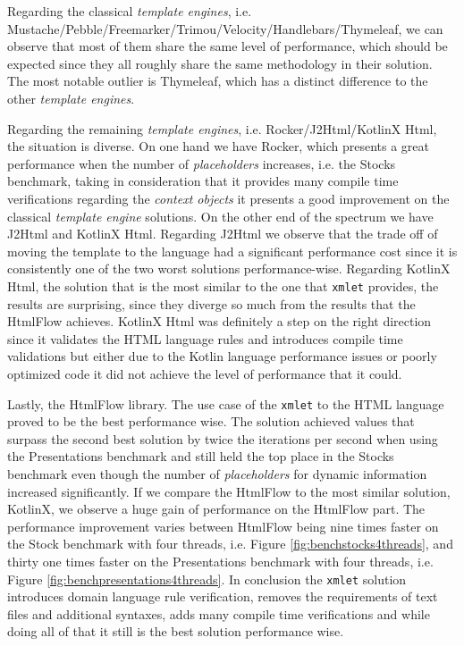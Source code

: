 \noindent
Regarding the classical \textit{template engines}, i.e. Mustache/Pebble/Freemarker/Trimou/Velocity/Handlebars/Thymeleaf, we can observe that most of them share the same level of performance, which should be expected since they all roughly share the same methodology in their solution. The most notable outlier is Thymeleaf, which has a distinct difference to the other \textit{template engines}.

\noindent
Regarding the remaining \textit{template engines}, i.e. Rocker/J2Html/KotlinX Html, the situation is diverse. On one hand we have Rocker, which presents a great performance when the number of \textit{placeholders} increases, i.e. the Stocks benchmark, taking in consideration that it provides many compile time verifications regarding the \textit{context objects} it presents a good improvement on the classical \textit{template engine} solutions. On the other end of the spectrum we have J2Html and KotlinX Html. Regarding J2Html we observe that the trade off of moving the template to the language had a significant performance cost since it is consistently one of the two worst solutions performance-wise. Regarding KotlinX Html, the solution that is the most similar to the one that \texttt{xmlet} provides, the results are surprising, since they diverge so much from the results that the HtmlFlow achieves. KotlinX Html was definitely a step on the right direction since it validates the \ac{HTML} language rules and introduces compile time validations but either due to the Kotlin language performance issues or poorly optimized code it did not achieve the level of performance that it could.

\noindent
Lastly, the HtmlFlow library. The use case of the \texttt{xmlet} to the \ac{HTML} language proved to be the best performance wise. The solution achieved values that surpass the second best solution by twice the iterations per second when using the Presentations benchmark and still held the top place in the Stocks benchmark even though the number of \textit{placeholders} for dynamic information increased significantly. If we compare the HtmlFlow to the most similar solution, KotlinX, we observe a huge gain of performance on the HtmlFlow part. The performance improvement varies between HtmlFlow being nine times faster on the Stock benchmark with four threads, i.e. Figure \ref{fig:benchstocks4threads}, and thirty one times faster on the Presentations benchmark with four threads, i.e. Figure \ref{fig:benchpresentations4threads}. In conclusion the \texttt{xmlet} solution introduces domain language rule verification, removes the requirements of text files and additional syntaxes, adds many compile time verifications and while doing all of that it still is the best solution performance wise.